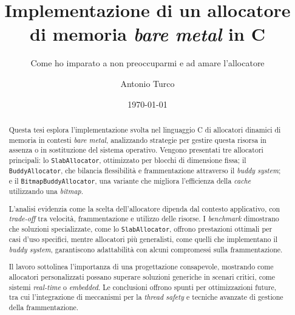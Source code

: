 \documentclass[noexaminfo]{sapthesis}
\title{Implementazione di un allocatore di memoria \textit{bare metal} in C}
\subtitle{Come ho imparato a non preoccuparmi e ad amare l'allocatore}
\author{Antonio Turco}
\date{\today}
\begin{document}
\frontmatter  
\maketitle
\dedication{A chi fa della curiosità il proprio mestiere}

\begin{abstract}
Questa tesi esplora l’implementazione svolta nel linguaggio C di allocatori dinamici di memoria in contesti \textit{bare metal}, analizzando strategie per gestire questa risorsa in assenza o in sostituzione del sistema operativo. Vengono presentati tre allocatori principali: lo \texttt{SlabAllocator}, ottimizzato per blocchi di dimensione fissa; il \texttt{BuddyAllocator}, che bilancia flessibilità e frammentazione attraverso il \textit{buddy system}; e il \texttt{BitmapBuddyAllocator}, una variante che migliora l’efficienza della \textit{cache} utilizzando una \textit{bitmap}.

L’analisi evidenzia come la scelta dell’allocatore dipenda dal contesto applicativo, con \textit{trade-off} tra velocità, frammentazione e utilizzo delle risorse. I \textit{benchmark} dimostrano che soluzioni specializzate, come lo \texttt{SlabAllocator}, offrono prestazioni ottimali per casi d’uso specifici, mentre allocatori più generalisti, come quelli che implementano il \textit{buddy system}, garantiscono adattabilità con alcuni compromessi sulla frammentazione.

Il lavoro sottolinea l’importanza di una progettazione consapevole, mostrando come allocatori personalizzati possano superare soluzioni generiche in scenari critici, come sistemi \textit{real-time} o \textit{embedded}. Le conclusioni offrono spunti per ottimizzazioni future, tra cui l’integrazione di meccanismi per la \textit{thread safety} e tecniche avanzate di gestione della frammentazione.
\end{abstract}


\mainmatter 
\tableofcontents













\backmatter
\end{document}
